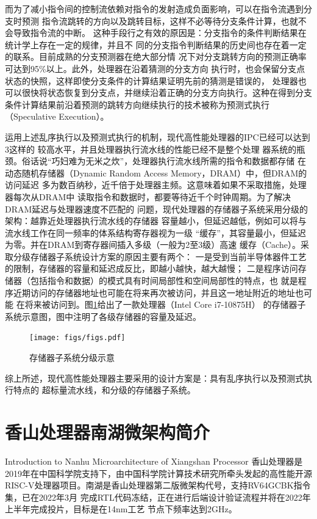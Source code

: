 而为了减小指令间的控制流依赖对指令的发射造成负面影响，可以在指令流遇到分支时预测
指令流跳转的方向以及跳转目标，这样不必等待分支条件计算，也就不会导致指令流的中断。
这种手段行之有效的原因是：分支指令的条件判断结果在统计学上存在一定的规律，并且不
同的分支指令判断结果的历史间也存在着一定的联系。目前成熟的分支预测器在绝大部分情
况下对分支跳转方向的预测正确率可达到95\%以上。此外，处理器在沿着猜测的分支方向
执行时，也会保留分支点状态的快照，这样即使分支条件的计算结果证明先前的猜测是错误的，
处理器也可以很快将状态恢复到分支点，并继续沿着正确的分支方向执行。这种在得到分支
条件计算结果前沿着预测的跳转方向继续执行的技术被称为预测式执行（Speculative Execution）。

运用上述乱序执行以及预测式执行的机制，现代高性能处理器的IPC已经可以达到3这样的
较高水平\cite{zhao2020sonicboom}，并且处理器执行流水线的性能已经不是整个处理
器系统的瓶颈。俗话说“巧妇难为无米之炊”，处理器执行流水线所需的指令和数据都存储
在动态随机存储器（Dynamic Random Access Memory，DRAM）中，但DRAM的访问延迟
多为数百纳秒，近千倍于处理器主频。这意味着如果不采取措施，处理器每次从DRAM中
读取指令和数据时，都要等待近千个时钟周期。为了解决DRAM延迟与处理器速度不匹配的
问题，现代处理器的存储器子系统采用分级的架构：越靠近处理器执行流水线的存储器
容量越小，但延迟越低，例如可以将与流水线工作在同一频率的体系结构寄存器视为一级
“缓存”，其容量最小，但延迟为零。并在DRAM到寄存器间插入多级（一般为2至3级）高速
缓存（Cache）。采取分级存储器子系统设计方案的原因主要有两个：
一是受到当前半导体器件工艺的限制，存储器的容量和延迟成反比，即越小越快，越大越慢；
二是程序访问存储器（包括指令和数据）的模式具有时间局部性和空间局部性的特点，也
就是程序近期访问的存储器地址也可能在将来再次被访问，并且这一地址附近的地址也可能
在将来被访问到。图\ref{fig:mem-heir}给出了一款处理器（Intel Core i7-10875H）
的存储器子系统示意图，图中注明了各级存储器的容量及延迟。

\begin{figure}[ht]
	\centering
	\texttt{[image: figs/figs.pdf]}
	\caption{存储器子系统分级示意}
	\label{fig:mem-heir}
\end{figure}

综上所述，现代高性能处理器主要采用的设计方案是：具有乱序执行以及预测式执行特点的
超标量流水线，和分级的存储器子系统。


\section{香山处理器南湖微架构简介}{Introduction to Nanhu Microarchitecture of Xiangshan Processor} \label{sec:xiangshan}
香山处理器是2019年在中国科学院支持下，由中国科学院计算技术研究所牵头发起的高性能开源
RISC-V处理器项目。南湖是香山处理器第二版微架构代号，支持RV64GCBK指令集，已在2022年3月
完成RTL代码冻结，正在进行后端设计验证流程并将在2022年上半年完成投片，目标是在14nm工艺
节点下频率达到2GHz。

